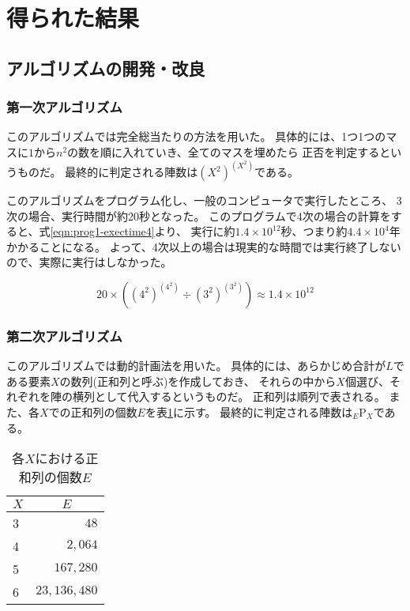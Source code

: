 \section{得られた結果}
\subsection{アルゴリズムの開発・改良}
\subsubsection{第一次アルゴリズム}
このアルゴリズムでは完全総当たりの方法を用いた。
具体的には、1つ1つのマスに$1$から$n^2$の数を順に入れていき、全てのマスを埋めたら
正否を判定するというものだ。
最終的に判定される陣数は$(X^2)^{(X^2)}$である。

このアルゴリズムをプログラム化し、一般のコンピュータで実行したところ、
3次の場合、実行時間が約20秒となった。
このプログラムで4次の場合の計算をすると、式\ref{eqn:prog1-exectime4}より、
実行に約$1.4 \times 10^{12}$秒、つまり約$4.4 \times 10^4$年かかることになる。
よって、4次以上の場合は現実的な時間では実行終了しないので、実際に実行はしなかった。

\begin{equation} \label{eqn:prog1-exectime4}
20 \times ((4^2)^{(4^2)} \div (3^2)^{(3^2)}) \approx 1.4 \times 10^{12}
\end{equation}


\subsubsection{第二次アルゴリズム}
このアルゴリズムでは動的計画法を用いた。
具体的には、あらかじめ合計が$L$である要素$X$の数列(正和列と呼ぶ)を作成しておき、
それらの中から$X$個選び、それぞれを陣の横列として代入するというものだ。
正和列は順列で表される。
また、各$X$での正和列の個数$E$を表\ref{tab:ple-each-X}に示す。
最終的に判定される陣数は$_E \mathrm{P} _X$である。

\begin{table}[htb]
	\begin{center}
	\begin{tabular}{|l|r|}
\hline \hline
\multicolumn{1}{|c|}{$X$} & \multicolumn{1}{|c|}{$E$} \\
\hline \hline
3 & $48$ \\
4 & $2,064$ \\
5 & $167,280$ \\
6 & $23,136,480$ \\
\hline
	\end{tabular}
	\end{center}
	\caption{各$X$における正和列の個数$E$}
	\label{tab:ple-each-X}
\end{table}

